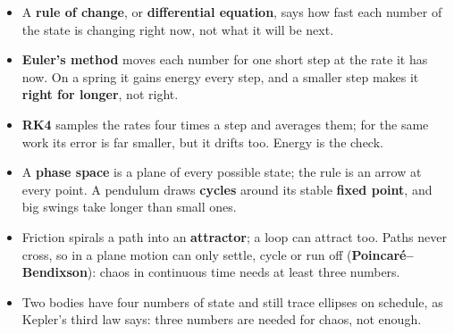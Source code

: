 \begin{summarybox}
\begin{itemize}
\item A \textbf{rule of change}, or \textbf{differential equation}, says how
  fast each number of the state is changing right now, not what it will be
  next.
\item \textbf{Euler's method} moves each number for one short step at the
  rate it has now. On a spring it gains energy every step, and a smaller step
  makes it \textbf{right for longer}, not right.
\item \textbf{RK4} samples the rates four times a step and averages them; for
  the same work its error is far smaller, but it drifts too. Energy is the
  check.
\item A \textbf{phase space} is a plane of every possible state; the rule is
  an arrow at every point. A pendulum draws \textbf{cycles} around its stable
  \textbf{fixed point}, and big swings take longer than small ones.
\item Friction spirals a path into an \textbf{attractor}; a loop can attract
  too. Paths never cross, so in a plane motion can only settle, cycle or run
  off (\textbf{Poincaré--Bendixson}): chaos in continuous time needs at least
  three numbers.
\item Two bodies have four numbers of state and still trace ellipses on
  schedule, as Kepler's third law says: three numbers are needed for chaos,
  not enough.
\end{itemize}
\end{summarybox}

\canyou


